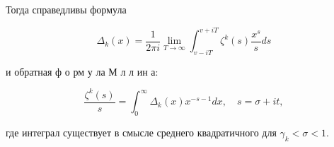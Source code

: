\documentclass[10pt]{article}
\begin{document}
Тогда справедливы формула



\[

\Delta_{k}(x)=\frac{1}{2 \pi i} \lim _{T \rightarrow \infty} \int_{v-i T}^{v+i T} \zeta^{k}(s) \frac{x^{s}}{s} d s

\]



и обратная ф о рм у ла М л л ин а:



\[

\frac{\zeta^{k}(s)}{s}=\int_{0}^{\infty} \Delta_{k}(x) x^{-s-1} d x, \quad s=\sigma+i t,

\]



где интеграл существует в смысле среднего квадратичного для $\gamma_{k}<\sigma<1$.
\end{document}
